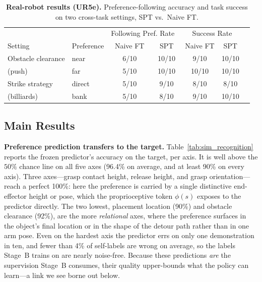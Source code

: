 \documentclass{article}
\begin{document}
\begin{table}[t]
  \centering
  \small
  \caption{\textbf{Real-robot results (UR5e).} Preference-following accuracy and
  task success on two cross-task settings, SPT vs.\ Naive FT. }
  \label{tab:real_main}
  \begin{tabular}{llccccc}
    \hline
    & & \multicolumn{2}{c}{Following Pref. Rate\ } & \multicolumn{2}{c}{Success Rate} \\
    Setting & Preference & Naive FT & SPT & Naive FT & SPT \\
    \hline
    Obstacle clearance & near    & 6/10 & 10/10 & 9/10 & 10/10 \\
    (push)             & far     & 5/10 & 10/10 & 10/10 & 10/10 \\
    Strike strategy    & direct  & 5/10 & 9/10 & 8/10 & 8/10 \\
    (billiards)        & bank    & 5/10 & 8/10 & 9/10 & 10/10 \\
    \hline
  \end{tabular}
\end{table}

\subsection{Main Results}
\label{sec:exp-main}

\textbf{Preference prediction transfers to the target.}
Table~\ref{tab:sim_recognition} reports the frozen predictor's accuracy on the
target, per axis. It is well above the $50\%$ chance line on all five axes
(96.4\% on average, and at least 90\% on every axis). Three axes---grasp contact
height, release height, and grasp orientation---reach a perfect 100\%: here the
preference is carried by a single distinctive end-effector height or pose, which
the proprioceptive token $\phi(s)$ exposes to the predictor directly. The two
lowest, placement location (90\%) and obstacle clearance (92\%), are the more
\emph{relational} axes, where the preference surfaces in the object's final
location or in the shape of the detour path rather than in one arm pose. Even on
the hardest axis the predictor errs on only one demonstration in ten, and fewer
than 4\% of self-labels are wrong on average, so the labels Stage~B trains on are
nearly noise-free. Because these predictions \emph{are} the supervision Stage~B
consumes, their quality upper-bounds what the policy can learn---a link we see
borne out below.
\end{document}
